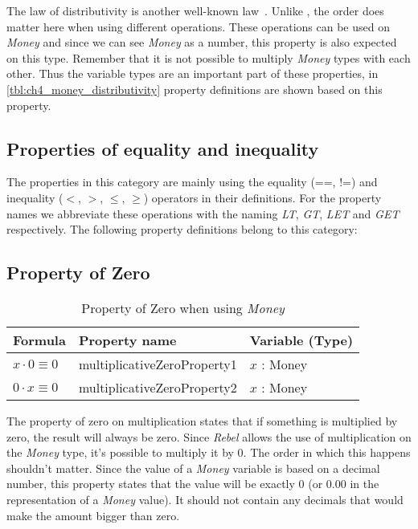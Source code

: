 \FloatBarrier\noindent
The law of distributivity is another well-known law~\cite{baumgart1961axioms}.
Unlike , the order does matter here when
using different operations. These operations can be used on \textit{Money} and
since we can see \textit{Money} as a number, this property is also expected on
this type. Remember that it is not possible to multiply \textit{Money} types
with each other.
Thus the variable types are an important part of these properties, in
\autoref{tbl:ch4_money_distributivity} property definitions are shown based on
this property.

\subsection{Properties of equality and inequality}
\label{ssct:properties_definitions_equalityproperties}
The properties in this category are mainly using the equality (==, !=) and
inequality ($<$, $>$, $\leq$, $\geq$) operators in their definitions. For the
property names we abbreviate these operations with the naming \textit{LT},
\textit{GT}, \textit{LET} and \textit{GET} respectively. The following
property definitions belong to this category:

\subsection*{Property of Zero}
\label{ssct:properties_propertyofzero}
\begin{table}[!ht]
\centering
\begin{tabular}{lll}
\hline
                        \textbf{Formula}     & \textbf{Property name}      & \textbf{Variable (Type)} \\ \hline
\rowcolor[HTML]{EFEFEF} $x \cdot 0 \equiv 0$ & multiplicativeZeroProperty1 & $x$ : Money              \\
                        $0 \cdot x \equiv 0$ & multiplicativeZeroProperty2 & $x$ : Money              \\ \hline
\end{tabular}
\caption{Property of Zero when using \textit{Money}}
\label{tbl:ch4_money_propertyzero}
\end{table}
\FloatBarrier\noindent
The property of zero on multiplication states that if something is multiplied
by zero, the result will always be zero. Since \textit{Rebel} allows the use of
multiplication on the \textit{Money} type, it's possible to multiply it by 0.
The order in which this happens shouldn't matter. Since the value of a
\textit{Money} variable is based on a decimal number, this property states that
the value will be exactly 0 (or 0.00 in the representation of a \textit{Money}
value). It should not contain any decimals that would make the amount bigger
than zero.

